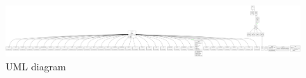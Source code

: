 \documentclass[11pt,a4paper]{article}
\begin{document}



\eject \pdfpagewidth=297mm \pdfpageheight=80mm
\newpage

\vspace*{\fill}

\begin{center}
    \begin{figure}
        \centering
        \includegraphics[width=0.9\pdfpagewidth]{classes.png}
        \caption{UML diagram}
        \label{fig:uml}
    \end{figure}
    \end{center}

\vspace*{\fill}
\end{document}
